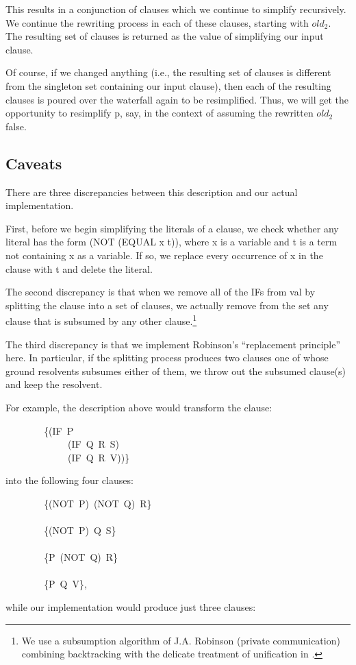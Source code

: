 \documentclass[10pt]{book}
\newenvironment{pubasis}{\begin{flushleft}}{\end{flushleft}}
\begin{document}
This results in a conjunction of clauses which we continue to
simplify recursively.  We continue the rewriting process in each of these clauses, starting with $old_{2}$.
The resulting set of
clauses is returned as the value of  simplifying our input clause.

Of course, if we changed anything (i.e., the resulting set of clauses
is different from the singleton set containing our input clause), then
each of the resulting clauses is poured over the waterfall again to
be resimplified.
Thus, we will get the opportunity to resimplify p, say, in the context of assuming
the rewritten $old_{2}$ false.

\subsection{Caveats}
There are three discrepancies between this description and our
actual implementation.

First, before we begin simplifying the literals of a clause,
we check whether any literal has the form (NOT (EQUAL x t)),
where x is a variable and t is a term not containing x as a variable.  If
so, we replace every occurrence of x in the clause with t
and delete the literal.

The second discrepancy is that when we  remove all of
the IFs from val by splitting the clause into a set of clauses, we
actually remove from the set any clause that is subsumed by any other clause.\footnote{We use a subsumption algorithm of J.A. Robinson (private communication) combining backtracking with the delicate treatment of unification in \cite{ROBINSON2}.}  

The third discrepancy is that we implement
Robinson's ``replacement principle'' \cite{ROBINSON} here.  In particular, if
the splitting process produces two clauses one of  whose ground resolvents subsumes either
of them, we throw out the subsumed clause(s) and keep the resolvent.

For example, the description above would transform the clause:
\begin{pubasis}
~~~~~~~~\{(IF~P\\
~~~~~~~~~~~~~(IF~Q~R~S)\\
~~~~~~~~~~~~~(IF~Q~R~V))\}\\
\end{pubasis}
into the following four clauses:
\begin{pubasis}
~~~~~~~~\{(NOT~P)~(NOT~Q)~R\}\\
~~~\\
~~~~~~~~\{(NOT~P)~Q~S\}\\
~~~\\
~~~~~~~~\{P~(NOT~Q)~R\}\\
~~~\\
~~~~~~~~\{P~Q~V\},\\
\end{pubasis}
while our implementation would produce just three clauses:
\end{document}
